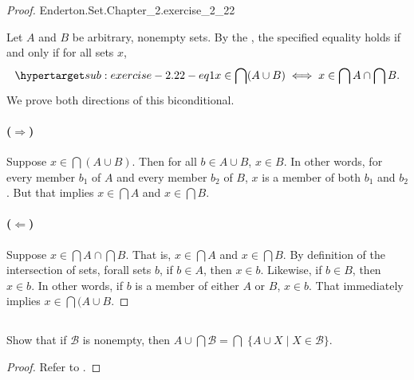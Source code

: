 \documentclass{report}
\begin{document}
\begin{proof}

    {Enderton.Set.Chapter\_2.exercise\_2\_22}

  Let $A$ and $B$ be arbitrary, nonempty sets.
  By the , the specified equality holds if and
    only if for all sets $x$,
    \begin{equation}
      \hyperlabel{sub:exercise-2.22-eq1}
      x \in \bigcap (A \cup B) \iff x \in \bigcap A \cap \bigcap B.
    \end{equation}
  We prove both directions of this biconditional.

  \paragraph{($\Rightarrow$)}%

    Suppose $x \in \bigcap (A \cup B)$.
    Then for all $b \in A \cup B$, $x \in B$.
    In other words, for every member $b_1$ of $A$ and every member $b_2$ of $B$,
      $x$ is a member of both $b_1$ and $b_2$.
    But that implies $x \in \bigcap A$ and $x \in \bigcap B$.

  \paragraph{($\Leftarrow$)}%

    Suppose $x \in \bigcap A \cap \bigcap B$.
    That is, $x \in \bigcap A$ and $x \in \bigcap B$.
    By definition of the intersection of sets, forall sets $b$, if $b \in A$,
      then $x \in b$.
    Likewise, if $b \in B$, then $x \in b$.
    In other words, if $b$ is a member of either $A$ or $B$, $x \in b$.
    That immediately implies $x \in \bigcap (A \cup B$.

\end{proof}

\subsection{}%

Show that if $\mathscr{B}$ is nonempty, then
  $A \cup \bigcap \mathscr{B} = \bigcap\; \{A \cup X \mid X \in \mathscr{B} \}$.

\begin{proof}

  Refer to .

\end{proof}
\end{document}
